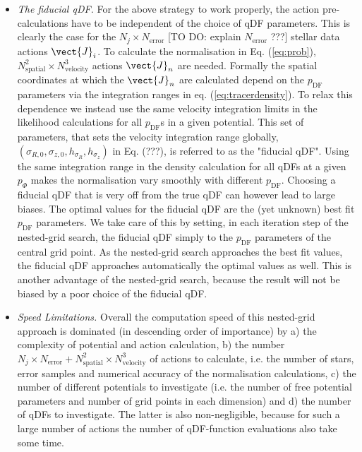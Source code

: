 \begin{itemize}
\item \emph{The fiducial qDF.} For the above strategy to work properly, the action pre-calculations have to be independent of the choice of qDF parameters. This is clearly the case for the $N_j \times N_\text{error}$ [TO DO: explain $N_\text{error}$ ???]  stellar data actions $\vect{J}_i$. To calculate the normalisation in Eq. (\ref{eq:prob}), $N_\text{spatial}^2 \times N_\text{velocity}^3$ actions $\vect{J}_n$ are needed. Formally the spatial coordinates at which the $\vect{J}_n$ are calculated depend on the $p_\text{DF}$ parameters via the integration ranges in eq. (\ref{eq:tracerdensity}). To relax this dependence we instead use the same velocity integration limits in the likelihood calculations for all $p_\text{DF}$s in a given potential. This set of parameters, that sets the velocity integration range globally, $(\sigma_{R,0},\sigma_{z,0},h_{\sigma_R},h_{\sigma_z})$ in Eq. (???), is referred to as the "fiducial qDF". Using the same integration range in the density calculation for all qDFs at a given $p_\Phi$ makes the normalisation vary smoothly with different $p_\text{DF}$. Choosing a fiducial qDF that is very off from the true qDF can however lead to large biases. The optimal values for the fiducial qDF are the (yet unknown) best fit $p_\text{DF}$ parameters. We take care of this by setting, in each iteration step of the nested-grid search, the fiducial qDF simply to the $p_\text{DF}$ parameters of the central grid point.  As the nested-grid search approaches the best fit values, the fiducial qDF approaches automatically the optimal values as well. This is another advantage of the nested-grid search, because the result will not be biased by a poor choice of the fiducial qDF.

\item \emph{Speed Limitations.} Overall the computation speed of this nested-grid approach is dominated (in descending order of importance) by a) the complexity of potential and action calculation, b) the number $N_j \times N_\text{error} + N_\text{spatial}^2 \times N_\text{velocity}^3$ of actions to calculate, i.e. the number of stars, error samples and numerical accuracy of the normalisation calculations, c) the number of different potentials to investigate (i.e. the number of free potential parameters and number of grid points in each dimension) and d) the number of qDFs to investigate. The latter is also non-negligible, because for such a large number of actions the number of  qDF-function evaluations also take some time.
\end{itemize}

